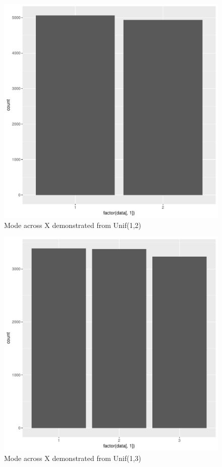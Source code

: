 \documentclass[11pt]{article}
\begin{document}
\begin{enumerate}
\begin{enumerate}
\begin{figure}[H]
	\end{figure}
	\begin{figure}[H]
		\centering
		\caption{Mode across X demonstrated from Unif(1,2)}
		\includegraphics[scale=.4]{2graph.pdf}
	\end{figure}
	\begin{figure}[H]
		\centering
		\caption{Mode across X demonstrated from Unif(1,3)}
		\includegraphics[scale=.4]{3graph.pdf}

\end{figure}
\end{enumerate}
\end{enumerate}
\end{document}
